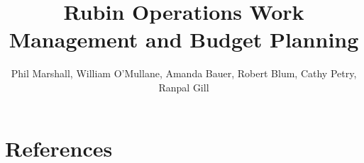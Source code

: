 \documentclass[DM,authoryear,toc]{lsstdoc}
\title{Rubin Operations Work Management and Budget Planning}
\author{%
Phil Marshall, William O'Mullane, Amanda Bauer, Robert Blum, Cathy Petry, Ranpal Gill
}
\date{\vcsDate}
\begin{document}
\maketitle



\appendix
\section{References} \label{sec:bib}
\renewcommand{\refname}{} %


%
\printglossaries
\end{document}
